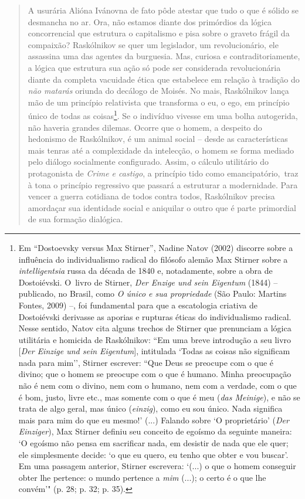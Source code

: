 {\begin{quote}
A usurária Alióna Ivánovna de fato pôde atestar que tudo o que é sólido
se desmancha no ar. Ora, não estamos diante dos primórdios da lógica
concorrencial que estrutura o capitalismo e pisa sobre o graveto frágil
da compaixão? Raskólnikov se quer um legislador, um revolucionário, ele
assassina uma das agentes da burguesia. Mas, curiosa e
contraditoriamente, a lógica que estrutura sua ação só pode ser
considerada revolucionária diante da completa vacuidade ética que
estabelece em relação à tradição do \emph{não matarás} oriunda do
decálogo de Moisés. No mais, Raskólnikov lança mão de um princípio
relativista que transforma o eu, o ego, em princípio único de todas as
coisas\footnote{Em ``Dostoevsky versus Max Stirner'', Nadine Natov
  (2002) discorre sobre a influência do individualismo radical do
  filósofo alemão Max Stirner sobre a \emph{intelligentsia} russa da
  década de 1840 e, notadamente, sobre a obra de Dostoiévski. O~livro de
  Stirner, \emph{Der Enzige und sein Eigentum} (1844) -- publicado, no
  Brasil, como \emph{O único e sua propriedade} (São Paulo: Martins
  Fontes, 2009) --, foi fundamental para que a escatologia criativa de
  Dostoiévski derivasse as aporias e rupturas éticas do individualismo
  radical. Nesse sentido, Natov cita alguns trechos de Stirner que
  prenunciam a lógica utilitária e homicida de Raskólnikov: ``Em uma
  breve introdução a seu livro {[}\emph{Der Einzige und sein
  Eigentum}{]}, intitulada `Todas as coisas não significam nada para
  mim'', Stirner escrever: ``Que Deus se preocupe com o que é divino;
  que o homem se preocupe com o que é humano. Minha preocupação não é
  nem com o divino, nem com o humano, nem com a verdade, com o que é
  bom, justo, livre etc., mas somente com o que é meu (\emph{das
  Meinige}), e não se trata de algo geral, mas único (\emph{einzig}),
  como eu sou único. Nada significa mais para mim do que eu mesmo!'
  (...) Falando sobre `O proprietário' (\emph{Der Einziger}), Max
  Stirner definiu seu conceito de egoísmo da seguinte maneira: `O
  egoísmo não pensa em sacrificar nada, em desistir de nada que ele
  quer; ele simplesmente decide: `o que eu quero, eu tenho que obter e
  vou buscar'. Em uma passagem anterior, Stirner escrevera: `(...) o que
  o homem conseguir obter lhe pertence: o mundo pertence a \emph{mim}
  (...); o certo é o que lhe convém'" (p. 28; p. 32; p. 35).}. Se o
indivíduo vivesse em uma bolha autogerida, não haveria grandes dilemas.
Ocorre que o homem, a despeito do hedonismo de Raskólnikov, é um animal
social -- desde as características mais tenras até a complexidade da
intelecção, o homem se forma mediado pelo diálogo socialmente
configurado. Assim, o cálculo utilitário do protagonista de \emph{Crime
e castigo}, a princípio tido como emancipatório,~traz à tona o princípio
regressivo que passará a estruturar a modernidade. Para vencer a guerra
cotidiana de todos contra todos, Raskólnikov precisa amordaçar sua
identidade social e aniquilar o outro que é parte primordial de sua
formação dialógica.


\end{quote}}
